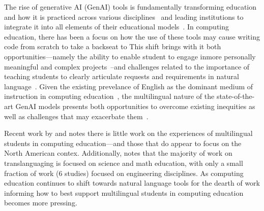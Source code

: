 
The rise of generative AI (GenAI) tools is fundamentally transforming education
and how it is practiced across various disciplines~\cite{prather2025beyond,
bond2024meta} and leading institutions to integrate it into all elements of
their educational models~\cite{southworth2023developing}. In computing
education, there has been a focus on how the use of these tools may cause
writing code from scratch to take a backseat to This shift brings with it both
opportunities---namely the ability to enable student to engage inmore
personally meaningful and complex projects~\cite{porter2024learn,
bottcher2025concepts}--and challenges related to the importance of teaching
students to clearly articulate requests and requirements in natural
language~\cite{becker2023programming, denny2024prompt, smith2024prompting,
reeves2024prompts}. Given the existing prevelance of English as the dominant
medium of instruction in computing education~\cite{guo2018non}, the multilingual
nature of the state-of-the-art GenAI models presents both opportunities to
overcome existing inequities as well as challenges that may exacerbate
them~\cite{yong2023prompting, smith2024explain, prather2025breaking}.

Recent work by \citet{jacob2022examining} and \citet{cheung2025systematic}
notes there is little work on the experiences of multilingual students in
computing education---and those that do appear to focus on the North American
contex. Additionally, \citet{cheung2025systematic} notes that the majority of
work on translanguaging is focused on science and math education, with only a
small fraction of work (6 studies) focused on engineering disciplines. As
computing education continues to shift towards natural language tools for 
the dearth of work informing how to best support multilingual students in
computing education becomes more pressing.

